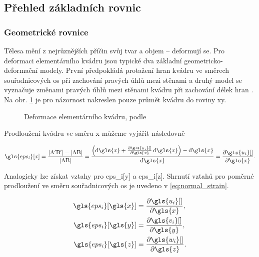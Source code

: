 \subsection{Přehled základních rovnic}

\subsubsection*{Geometrické rovnice}
Tělesa mění z nejrůznějších příčin svůj tvar a objem -- deformují se. Pro deformaci elementárního kvádru jsou typické dva základní geometricko-deformační modely. První předpokládá protažení hran kvádru ve směrech souřadnicových os při zachování pravých úhlů mezi stěnami a druhý model se vyznačuje změnami pravých úhlů mezi stěnami kvádru při zachování délek hran \cite[9]{prpe10}. Na obr. \ref{fig:elementary_block} je pro názornost nakreslen pouze průmět kvádru do roviny \gls{x}\gls{y}.

\begin{figure}[H]
    
    \caption[Deformace elementárního kvádru]{Deformace elementárního kvádru, podle \cite[obr. 1.2]{teorie_pruznosti}}
    \label{fig:elementary_block}
\end{figure}

Prodloužení kvádru ve směru \gls{x} můžeme vyjářit následovně

\begin{equation}
    \gls{eps_i}[x] 
    = 
    \frac{|\mathrm{A'B'}| - |\mathrm{AB}|}{|\mathrm{AB}|}
    =
    \frac{\left(\dd{\gls{x}} + \pdv{\gls{u_i}[ ]}{\gls{x}} \dd{\gls{x}}\right) - \dd{\gls{x} }}{\dd{\gls{x}}}
    =
    \pdv{\gls{u_i}[ ]}{\gls{x}}.
\end{equation}

Analogicky lze získat vztahy pro \gls{eps_i}[\gls{y}] a \gls{eps_i}[\gls{z}]. Shrnutí vztahů pro poměrné prodloužení ve směru souřadnicových os je uvedeno v \ref{eq:normal_strain}.

\begin{equation}
    \label{eq:normal_strain}
    \begin{aligned}
        \gls{eps_i}[\gls{x}] & = \pdv{\gls{u_i}[ ]}{\gls{x}}, \\
        \gls{eps_i}[\gls{y}] & = \pdv{\gls{v_i}[ ]}{\gls{y}}, \\
        \gls{eps_i}[\gls{z}] & = \pdv{\gls{w_i}[ ]}{\gls{z}}.
    \end{aligned}
\end{equation}

